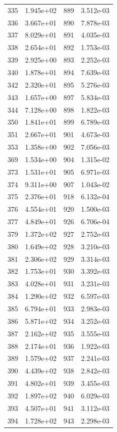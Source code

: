 \documentclass[12pt]{article}
\begin{document}
\begin{longtable}{@{}cccc@{}}
335 & 1.945e+02 & 889 & 3.512e-03 \\
336 & 3.667e+01 & 890 & 7.878e-03 \\
337 & 8.029e+01 & 891 & 4.035e-03 \\
338 & 2.654e+01 & 892 & 1.753e-03 \\
339 & 2.925e+00 & 893 & 2.252e-03 \\
340 & 1.878e+01 & 894 & 7.639e-03 \\
342 & 2.320e+01 & 895 & 5.276e-03 \\
343 & 1.657e+00 & 897 & 5.834e-03 \\
344 & 7.128e+00 & 898 & 1.822e-03 \\
350 & 1.841e+01 & 899 & 6.789e-03 \\
351 & 2.667e+01 & 901 & 4.673e-03 \\
353 & 1.358e+00 & 902 & 7.056e-03 \\
369 & 1.534e+00 & 904 & 1.315e-02 \\
373 & 1.531e+01 & 905 & 6.971e-03 \\
374 & 9.311e+00 & 907 & 1.043e-02 \\
375 & 2.376e+01 & 918 & 6.132e-04 \\
376 & 4.554e+01 & 920 & 1.500e-03 \\
377 & 4.849e+01 & 926 & 6.706e-04 \\
379 & 1.372e+02 & 927 & 2.752e-03 \\
380 & 1.649e+02 & 928 & 3.210e-03 \\
381 & 2.306e+02 & 929 & 3.314e-03 \\
382 & 1.753e+01 & 930 & 3.392e-03 \\
383 & 4.028e+01 & 931 & 3.231e-03 \\
384 & 1.290e+02 & 932 & 6.597e-03 \\
385 & 6.794e+01 & 933 & 2.983e-03 \\
386 & 5.871e+02 & 934 & 3.252e-03 \\
387 & 2.162e+02 & 935 & 3.555e-03 \\
388 & 2.174e+01 & 936 & 1.922e-03 \\
389 & 1.579e+02 & 937 & 2.241e-03 \\
390 & 4.439e+02 & 938 & 2.842e-03 \\
391 & 4.802e+01 & 939 & 3.455e-03 \\
392 & 1.897e+02 & 940 & 6.029e-03 \\
393 & 4.507e+01 & 941 & 3.112e-03 \\
394 & 1.728e+02 & 943 & 2.298e-03 \\

\end{longtable}
\end{document}
